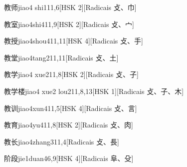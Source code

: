 \begin{entry}{教师}{jiao4 shi1}{11,6}[HSK 2][Radicais ⽁、⼱]
\end{entry}

\begin{entry}{教室}{jiao4shi4}{11,9}[HSK 2][Radicais ⽁、⼧]
\end{entry}

\begin{entry}{教授}{jiao4shou4}{11,11}[HSK 4][Radicais ⽁、⼿]
\end{entry}

\begin{entry}{教堂}{jiao4tang2}{11,11}[Radicais ⽁、⼟]
\end{entry}

\begin{entry}{教学}{jiao4 xue2}{11,8}[HSK 2][Radicais ⽁、⼦]
\end{entry}

\begin{entry}{教学楼}{jiao4 xue2 lou2}{11,8,13}[HSK 1][Radicais ⽁、⼦、⽊]
\end{entry}

\begin{entry}{教训}{jiao4xun4}{11,5}[HSK 4][Radicais ⽁、⾔]
\end{entry}

\begin{entry}{教育}{jiao4yu4}{11,8}[HSK 2][Radicais ⽁、⾁]
\end{entry}

\begin{entry}{教长}{jiao4zhang3}{11,4}[Radicais ⽁、⾧]
\end{entry}

\begin{entry}{阶段}{jie1duan4}{6,9}[HSK 4][Radicais ⾩、⽎]
\end{entry}

